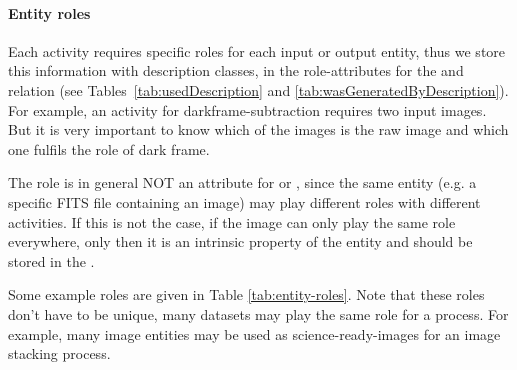\paragraph{Entity roles}\label{sec:entity-roles}
Each activity requires specific roles for each input or output entity, thus 
we store this information with description classes, in the role-attributes for 
the  and  relation (see Tables~\ref{tab:usedDescription} and \ref{tab:wasGeneratedByDescription}).
For example, an activity for darkframe-subtraction requires two input images. But it is 
very important to know which of the images is the raw image and 
which one fulfils the role of dark frame.

The role is in general NOT an attribute for  or , 
since the same entity (e.g. a specific FITS file containing an image) may play 
different roles with different activities. If this is not the case, if the 
image can only play the same role everywhere, only then it is an intrinsic 
property of the entity and should be stored in the .




Some example roles are given in Table \ref{tab:entity-roles}.
Note that these roles don't have to be unique, many datasets may play the same role for 
a process. For example, many image entities may be used as science-ready-images for an 
image stacking process.

